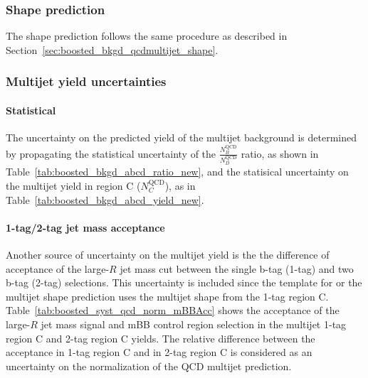 \subsubsection{Shape prediction}
The shape prediction follows the same procedure as described in Section~\ref{sec:boosted_bkgd_qcdmultijet_shape}.

\subsubsection{Multijet yield uncertainties}
\label{sec:boosted_bkgd_qcdmultijet_yield_unc}
 
\paragraph{Statistical} 
The uncertainty on the predicted yield of the multijet background is determined by propagating the statistical uncertainty
of the $\frac{N_B^\text{QCD}}{N_D^\text{QCD}}$ ratio, as shown in Table~\ref{tab:boosted_bkgd_abcd_ratio_new}, and the statisical
uncertainty on the multijet yield in region C ($N_C^\text{QCD}$), as in Table~\ref{tab:boosted_bkgd_abcd_yield_new}.
 
\paragraph{1-tag/2-tag jet mass acceptance} 
Another source of uncertainty on the multijet yield is the  
the difference of acceptance of the large-$R$ jet mass cut between the single b-tag (1-tag) and two b-tag (2-tag) selections.
This uncertainty is included since the template for or the multijet shape prediction uses the multijet shape
from the 1-tag region C. Table~\ref{tab:boosted_syst_qcd_norm_mBBAcc} shows the acceptance
of the large-$R$ jet mass signal and mBB control region selection in the multijet 1-tag region C and 2-tag region C yields.
The relative difference between the acceptance in 1-tag region C and in 2-tag region C is considered as an uncertainty on the normalization
of the QCD multijet prediction.
 
